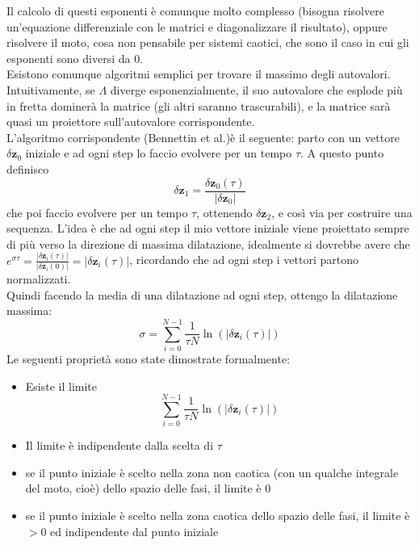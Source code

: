 \documentclass[a4paper,12pt]{article}
\theoremstyle{plain}
\renewcommand{\vec}[1]{{\boldsymbol{#1}}}
\theoremstyle{definition}
\newcommand{\f}[2]{\frac{#1}{#2}}
\theoremstyle{remark}
\begin{document}
Il calcolo di questi esponenti è comunque molto complesso (bisogna risolvere un'equazione differenziale con le matrici e  diagonalizzare il risultato), oppure risolvere il moto, cosa non pensabile per sistemi caotici, che sono il caso in cui gli esponenti sono diversi da $0$.\\ Esistono comunque algoritmi semplici per trovare il massimo degli autovalori. Intuitivamente, se $\Lambda$ diverge esponenzialmente, il suo autovalore che esplode più in fretta dominerà la matrice (gli altri saranno trascurabili), e la matrice sarà quasi  un proiettore sull'autovalore corrispondente.
\\ L'algoritmo corrispondente (Bennettin et al.)è il seguente: parto con un vettore $\delta\vec{z}_0$ iniziale e ad ogni step lo faccio evolvere per un tempo $\tau$. A questo punto definisco 
\[\delta \vec{z}_1=\f{\delta\vec{z}_0(\tau)}{|\delta\vec{z}_0|}\]
che poi faccio evolvere per un tempo $\tau$, ottenendo $\delta \vec{z}_2$, e così via per costruire una sequenza.
L'idea è che ad ogni step il mio vettore iniziale viene proiettato sempre di più verso la direzione di massima dilatazione, idealmente si dovrebbe avere che $e^{\sigma\tau}=\f{|\delta \vec{z}_i(\tau)|}{|\delta \vec{z}_i(0)|}=|\delta \vec{z}_i(\tau)|$, ricordando che ad ogni step i vettori partono normalizzati.\\ Quindi facendo la media di una dilatazione ad ogni step, ottengo la dilatazione massima:
\[\sigma=\sum_{i=0}^{N-1}\f{1}{\tau N }\ln \left( {|\delta \vec{z}_i(\tau)|}	\right)	\]
Le seguenti proprietà sono state dimostrate formalmente:
\begin{itemize}

\item Esiste il limite\[
\sum_{i=0}^{N-1}\f{1}{\tau N }\ln \left( {|\delta \vec{z}_i(\tau)|}	\right)\]

\item Il limite è indipendente dalla scelta di $\tau$
\item se il punto iniziale è scelto nella zona non caotica (con un qualche integrale del moto, cioè) dello spazio delle fasi, il limite è 0
\item  se il punto iniziale è scelto nella zona caotica dello spazio delle fasi, il limite è $>0$ ed indipendente dal punto iniziale

\end{itemize}
\end{document}
